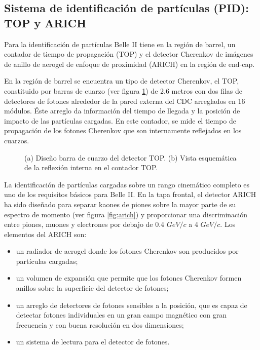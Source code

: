 \subsection{Sistema de identificación de partículas (PID): TOP y ARICH }
Para la identificación de partículas Belle II tiene en la región de barrel, un contador de tiempo de propagación (TOP) y el detector Cherenkov de imágenes de anillo de aerogel de enfoque de proximidad (ARICH) en la región de end-cap.

En la región de barrel se encuentra un tipo de detector Cherenkov, el TOP, constituido por barras de cuarzo (ver figura \ref{fig:top}) de 2.6 metros con dos filas de detectores de fotones alrededor de la pared externa del CDC arreglados en 16 módulos. Éste arreglo da información del tiempo de llegada y la posición de impacto de las partículas cargadas. En este contador, se mide el tiempo de propagación de los fotones Cherenkov que son internamente reflejados en los cuarzos. 
\begin{figure}%
    \centering
    \qquad
    \caption{(a) Diseño barra de cuarzo del detector TOP. (b) Vista esquemática de la reflexión interna en el contador TOP. \cite{abe2010belle}}%
    \label{fig:top}%
\end{figure}

La identificación de partículas cargadas sobre un rango cinemático completo es uno de los requisitos básicos para Belle II. En la tapa frontal, el detector ARICH ha sido diseñado para separar kaones de piones sobre la mayor parte de su espectro de momento (ver figura \ref{fig:arich}) y proporcionar una discriminación entre piones, muones y electrones por debajo de 0.4 \(GeV/c\) a 4 \(GeV/c\). Los elementos del ARICH son:

\begin{itemize}
    \item un radiador de aerogel donde los fotones Cherenkov son producidos por partículas cargadas;
    \item un volumen de expansión que permite que los fotones Cherenkov formen anillos sobre la superficie del detector de fotones;
    \item un arreglo de detectores de fotones sensibles a la posición, que es capaz de detectar fotones individuales en un gran campo magnético con gran frecuencia y con buena resolución en dos dimensiones;
    \item un sistema de lectura para el detector de fotones.
\end{itemize}


